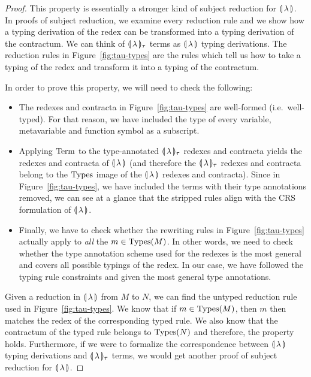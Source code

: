 \begin{proof}
  This property is essentially a stronger kind of subject reduction for
  $\llparenthesis \, \lambda \, \rrparenthesis$. In proofs of subject reduction, we examine every
  reduction rule and we show how a typing derivation of the redex can be
  transformed into a typing derivation of the contractum. We can think of
  $\llparenthesis \, \lambda \, \rrparenthesis_\tau$ terms as $\llparenthesis \, \lambda \, \rrparenthesis$ typing
  derivations. The reduction rules in Figure~\ref{fig:tau-types} are the
  rules which tell us how to take a typing of the redex and transform it
  into a typing of the contractum.
  
  In order to prove this property, we will need to check the following:
  \begin{itemize}
  \item The redexes and contracta in Figure~\ref{fig:tau-types} are
    well-formed (i.e.\ well-typed). For that reason, we have included the
    type of every variable, metavariable and function symbol as a
    subscript.
  \item Applying $\operatorname{Term}$ to the type-annotated $\llparenthesis \, \lambda \, \rrparenthesis_\tau$
    redexes and contracta yields the redexes and contracta of
    $\llparenthesis \, \lambda \, \rrparenthesis$ (and therefore the $\llparenthesis \, \lambda \, \rrparenthesis_\tau$ redexes
    and contracta belong to the $\operatorname{Types}$ image of the $\llparenthesis \, \lambda \, \rrparenthesis$
    redexes and contracta). Since in Figure~\ref{fig:tau-types}, we have
    included the terms with their type annotations removed, we can see at a
    glance that the stripped rules align with the CRS formulation of
    $\llparenthesis \, \lambda \, \rrparenthesis$.
  \item Finally, we have to check whether the rewriting rules in
    Figure~\ref{fig:tau-types} actually apply to \emph{all} the
    $m \in \operatorname{Types}(M)$. In other words, we need to check whether the type
    annotation scheme used for the redexes is the most general and covers
    all possible typings of the redex. In our case, we have followed the
    typing rule constraints and given the most general type annotations.
  \end{itemize}
  
  Given a reduction in $\llparenthesis \, \lambda \, \rrparenthesis$ from $M$ to $N$, we can find the
  untyped reduction rule used in Figure~\ref{fig:tau-types}. We know that
  if $m \in \operatorname{Types}(M)$, then $m$ then matches the redex of the
  corresponding typed rule. We also know that the contractum of the typed
  rule belongs to $\operatorname{Types}(N)$ and therefore, the property
  holds. Furthermore, if we were to formalize the correspondence between
  $\llparenthesis \, \lambda \, \rrparenthesis$ typing derivations and $\llparenthesis \, \lambda \, \rrparenthesis_\tau$ terms,
  we would get another proof of subject reduction for $\llparenthesis \, \lambda \, \rrparenthesis$.
\end{proof}

